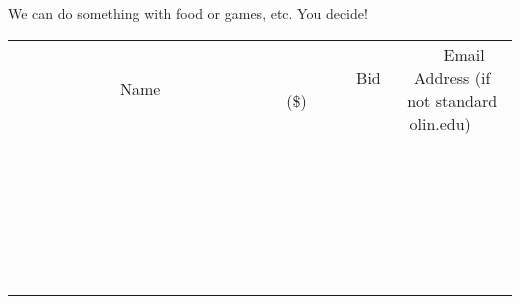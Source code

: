\documentclass[11pt]{article}
\begin{document}
We can do something with food or games, etc. You decide!
\\[6ex]
\begin{tabular}{c c c}
~~~~~~~~~~~~~Name~~~~~~~~~~~~~ & ~~~~~~~~~Bid (\$)~~~~~~~~~  & ~~~Email Address (if not standard olin.edu)~~~\\
 & & \\
\hline
 & & \\
\hline
 & & \\
\hline
 & & \\
\hline
 & & \\
\hline
 & & \\
\hline
 & & \\
\hline
 & & \\
\hline
 & & \\
\hline
 & & \\
\hline
 & & \\
\hline
 & & \\
\hline
 & & \\
\hline
 & & \\
\hline
 & & \\
\hline
 & & \\
\hline
 & & \\
\hline
 & & \\
\hline
 & & \\
\hline
 & & \\
\hline
 & & \\
\hline
 & & \\
\hline
 & & \\
\hline
 & & \\
\hline
 & & \\
\hline
 & & \\
\hline
\end{tabular}
\newpage
\end{document}
